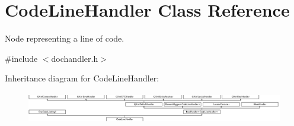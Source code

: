 \hypertarget{class_code_line_handler}{}\section{Code\+Line\+Handler Class Reference}
\label{class_code_line_handler}


Node representing a line of code.  




{\ttfamily \#include $<$dochandler.\+h$>$}

Inheritance diagram for Code\+Line\+Handler\+:\begin{figure}[H]
\begin{center}
\leavevmode
\includegraphics[height=1.385281cm]{class_code_line_handler}
\end{center}
\end{figure}
